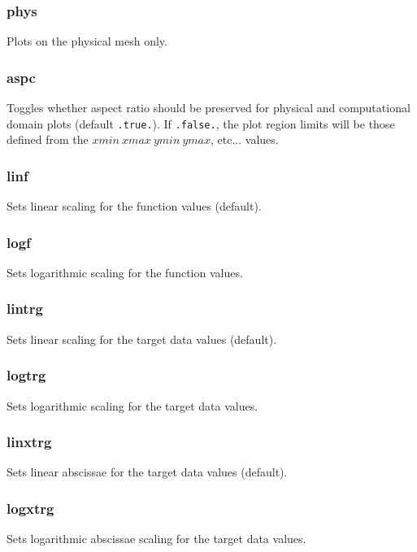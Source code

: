 \documentclass[a4paper,10pt]{report}
\begin{document}
\subsubsection{phys}\label{sec:phys}
Plots on the physical mesh only.

\subsubsection{aspc}\label{sec:aspc}
Toggles whether aspect ratio should be preserved for physical
and computational domain plots (default {\tt .true.}).
If {\tt .false.}, the plot region limits will be those defined
from the $xmin~xmax~ymin~ymax$, etc... values.

\subsubsection{linf}\label{sec:linf}
Sets linear scaling for the function values (default).

\subsubsection{logf}\label{sec:logf}
Sets logarithmic scaling for the function values.

\subsubsection{lintrg}\label{sec:lintrg}
Sets linear scaling for the target data values (default).

\subsubsection{logtrg}\label{sec:logtrg}
Sets logarithmic scaling for the target data values.

\subsubsection{linxtrg}\label{sec:linxtrg}
Sets linear abscissae for the target data values (default).

\subsubsection{logxtrg}\label{sec:logxtrg}
Sets logarithmic abscissae scaling for the target data values.
\end{document}
